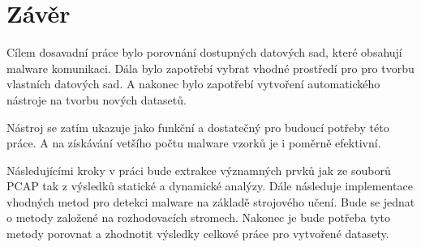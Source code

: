     
\chapter{Závěr}
Cílem dosavadní práce bylo porovnání dostupných datových sad, které obsahují malware komunikaci. Dála bylo zapotřebí vybrat vhodné prostředí pro 
pro tvorbu vlastních datových sad. A nakonec bylo zapotřebí vytvoření automatického nástroje na tvorbu nových datasetů.

Nástroj se zatím ukazuje jako funkční a dostatečný pro budoucí potřeby této práce. A na získávání vetšího počtu malware vzorků je i poměrně efektivní.

Následujícími kroky v práci bude extrakce významných prvků jak ze souborů PCAP tak z výsledků statické a dynamické analýzy.
Dále následuje implementace vhodných metod pro detekci malware na základě strojového učení. Bude se jednat o metody založené na rozhodovacích stromech.
Nakonec je bude potřeba tyto metody porovnat a zhodnotit výsledky celkové práce pro vytvořené datasety.



%
